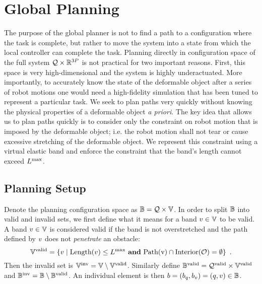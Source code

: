 \section{Global Planning}
\label{sec:global_planning}

The purpose of the global planner is not to find a path to a configuration where the task is complete, but rather to move the system into a state from which the local controller can complete the task. Planning directly in configuration space of the full system $\mathcal{Q} \times \mathbb{R}^{3P}$ is not practical for two important reasons. First, this space is very high-dimensional and the system is highly underactuated. More importantly, to accurately know the state of the deformable object after a series of robot motions one would need a high-fidelity simulation that has been tuned to represent a particular task. We seek to plan paths very quickly without knowing the physical properties of a deformable object \textit{a priori}. The key idea that allows us to plan paths quickly is to consider only the constraint on robot motion that is imposed by the deformable object; i.e. the robot motion shall not tear or cause excessive stretching of the deformable object. We represent this constraint using a virtual elastic band and enforce the constraint that the band's length cannot exceed $L^\textrm{max}$.


\subsection{Planning Setup}

Denote the planning configuration space as $\mathbb{B} = \mathcal{Q} \times \mathbb{V}$. In order to split $\mathbb{B}$ into valid and invalid sets, we first define what it means for a band $v \in \mathbb{V}$ to be valid. A band $v \in \mathbb{V}$ is considered valid if the band is not overstretched and the path defined by $v$ does not \textit{penetrate} an obstacle:
\begin{equation}
    \mathbb{V}^{\textrm{valid}} = \{ v \mid \textrm{Length}(v) \leq L^\textrm{max} \textrm{ \textbf{and} } 
                                    \textrm{Path(v)} \cap \textrm{Interior}(\mathcal{O}) = \emptyset \} \enspace .
\end{equation}
Then the invalid set is $\mathbb{V}^{\textrm{inv}} = \mathbb{V} \setminus \mathbb{V}^{\textrm{valid}}$. Similarly define $\mathbb{B}^\textrm{valid} = \mathcal{Q}^{\textrm{valid}} \times \mathbb{V}^{\textrm{valid}}$ and $\mathbb{B}^\textrm{inv} = \mathbb{B} \setminus \mathbb{B}^\textrm{valid}$. An individual element is then $b = (b_q, b_v) = (q, v) \in \mathbb{B}$.

